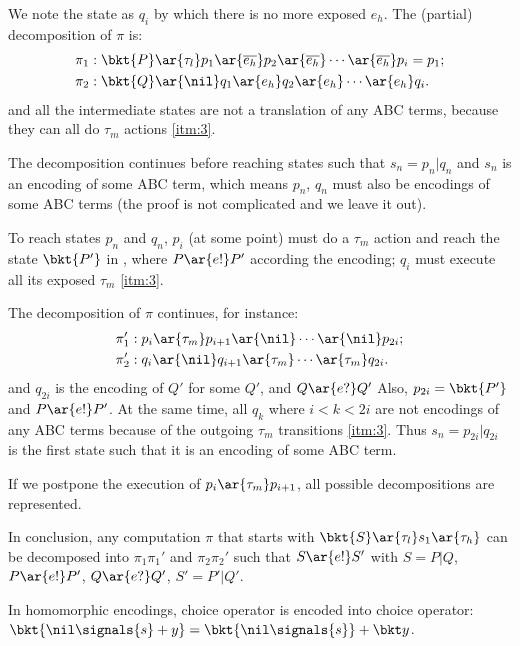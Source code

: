   We note the state as $q_i$ by which there is no more exposed $e_h$.
  The (partial) decomposition of $\pi$ is:
  \begin{align*}
    & \pi_1 : \bkt{P} \ar{\tau_l} p_1 \ar{\overline{e_h}} p_2 \ar{\overline{e_h}} \cdots \ar{\overline{e_h}} p_i = p_1 ;\\
    & \pi_2 : \bkt{Q} \ar{\nil} q_1 \ar{e_h} q_2 \ar{e_h} \cdots \ar{e_h} q_i .
  \end{align*}
  and all the intermediate states are not a translation of any ABC terms, because they can all do $\tau_m$ actions \ref{itm:3}.

  The decomposition continues before reaching states such that $s_n = p_n|q_n$ and $s_n$ is an encoding of some ABC term, which means $p_n$, $q_n$ must also be encodings of some ABC terms (the proof is not complicated and we leave it out).

  To reach states $p_n$ and $q_n$, $p_i$ (at some point) must do a $\tau_m$ action and reach the state $\bkt{P'}$ in , where $P\ar{e!}P'$ according the encoding; $q_i$ must execute all its exposed $\tau_m$ \ref{itm:3}. %

  The decomposition of $\pi$ continues, for instance:
  \begin{align*}
    & \pi_1' : p_i \ar{\tau_m} p_{i+1} \ar{\nil} \cdots \ar{\nil} p_{2i};\\
    & \pi_2' : q_i \ar{\nil} q_{i+1} \ar{\tau_m} \cdots \ar{\tau_m} q_{2i}.
  \end{align*}
  and $q_{2i}$ is the encoding of $Q'$ for some $Q'$, and $Q\ar{e?}Q'$
  Also, $p_{2i} = \bkt{P'}$ and $P\ar{e!}P'$.
  At the same time, all $q_k$ where $i < k < 2i$ are not encodings of any ABC terms because of the outgoing $\tau_m$ transitions \ref{itm:3}.
  Thus $s_n = p_{2i}|q_{2i}$ is the first state such that it is an encoding of some ABC term.

  If we postpone the execution of $p_i \ar{\tau_m} p_{i+1}$, all possible decompositions are represented.

  In conclusion, any computation $\pi$ that starts with $\bkt{S}\ar{\tau_l}s_1\ar{\tau_h}$ can be decomposed into $\pi_1\pi_1'$ and $\pi_2\pi_2'$ such that $S\ar{e!}S'$ with $S = P|Q$, $P\ar{e!}P'$, $Q\ar{e?}Q'$, $S' = P'|Q'$.


  In homomorphic encodings, choice operator is encoded into choice operator: $\bkt{\nil\signals{s} + y} = \bkt{\nil\signals{s}} + \bkt y$.
